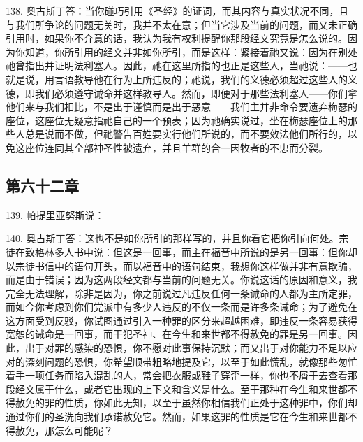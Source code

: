 138. 奥古斯丁答：当你碰巧引用《圣经》的证词，而其内容与真实状况不同，且与我们所争论的问题无关时，我并不太在意；但当它涉及当前的问题，而又未正确引用时，如果你不介意的话，我认为我有权利提醒你那段经文究竟是怎么说的。因为你知道，你所引用的经文并非如你所引，而是这样：紧接着祂又说：因为在别处祂曾指出并证明法利塞人。因此，祂在这里所指的也正是这些人，当祂说：——也就是说，用言语教导他在行为上所违反的；祂说，我们的义德必须超过这些人的义德，即我们必须遵守诫命并这样教导人。然而，即便对于那些法利塞人——你们拿他们来与我们相比，不是出于谨慎而是出于恶意——我们主并非命令要遗弃梅瑟的座位，这座位无疑意指祂自己的一个预表；因为祂确实说过，坐在梅瑟座位上的那些人总是说而不做，但祂警告百姓要实行他们所说的，而不要效法他们所行的，以免这座位连同其全部神圣性被遗弃，并且羊群的合一因牧者的不忠而分裂。\par


\subsection{第六十二章}

139. 帕提里亚努斯说：\par

140. 奥古斯丁答：这也不是如你所引的那样写的，并且你看它把你引向何处。宗徒在致格林多人书中说：但这是一回事，而主在福音中所说的是另一回事：但你却以宗徒书信中的语句开头，而以福音中的语句结束，我想你这样做并非有意欺骗，而是由于错误；因为这两段经文都与当前的问题无关。你说这话的原因和意义，我完全无法理解，除非是因为，你之前说过凡违反任何一条诫命的人都为主所定罪，而如今你考虑到你们党派中有多少人违反的不仅一条而是许多条诫命；为了避免在这方面受到反驳，你试图通过引入一种罪的区分来超越困难，即违反一条容易获得宽恕的诫命是一回事，而干犯圣神、在今生和来世都不得赦免的罪是另一回事。因此，出于对罪的感染的恐惧，你不愿对此事保持沉默；而又出于对你能力不足以应对的深刻问题的恐惧，你希望顺带粗略地提及它，以至于如此慌乱，就像那些匆忙着手一项任务而陷入混乱的人，常会把衣服或鞋子穿歪一样，你也不屑于去查看那段经文属于什么，或者它出现的上下文和含义是什么。至于那种在今生和来世都不得赦免的罪的性质，你如此无知，以至于虽然你相信我们正处于这种罪中，你们却通过你们的圣洗向我们承诺赦免它。然而，如果这罪的性质是它在今生和来世都不得赦免，那怎么可能呢？\par

